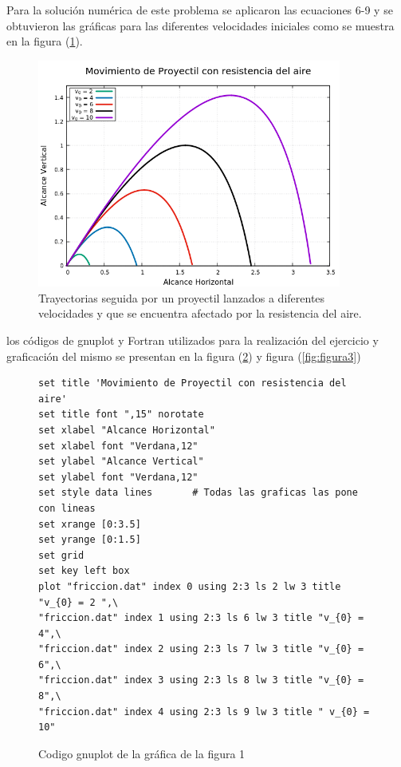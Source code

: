 \documentclass[12pt,a4paper,twoside]{article}
\begin{document}
Para la solución numérica de este  problema se aplicaron las ecuaciones 6-9  y se obtuvieron las gráficas para las diferentes velocidades iniciales como se muestra en la figura (\ref{fig:figura1}).

\newpage
\begin{figure}[h]
\centering
\includegraphics[width=10cm]{Imagen.png} 
\caption{Trayectorias seguida por un proyectil lanzados a diferentes velocidades y que se encuentra afectado por la resistencia del aire.}
\label{fig:figura1}
\end{figure}

los códigos de gnuplot y Fortran utilizados para la realización del ejercicio y graficación del mismo se presentan en la figura (\ref{fig:figura2}) y figura (\ref{fig:figura3})\\

\begin{figure}[h]
 \centering 
\begin{verbatim}
set title 'Movimiento de Proyectil con resistencia del aire'
set title font ",15" norotate
set xlabel "Alcance Horizontal"
set xlabel font "Verdana,12"
set ylabel "Alcance Vertical"
set ylabel font "Verdana,12"
set style data lines       # Todas las graficas las pone con lineas
set xrange [0:3.5]
set yrange [0:1.5]
set grid
set key left box
plot "friccion.dat" index 0 using 2:3 ls 2 lw 3 title "v_{0} = 2 ",\
"friccion.dat" index 1 using 2:3 ls 6 lw 3 title "v_{0} = 4",\
"friccion.dat" index 2 using 2:3 ls 7 lw 3 title "v_{0} = 6",\
"friccion.dat" index 3 using 2:3 ls 8 lw 3 title "v_{0} = 8",\
"friccion.dat" index 4 using 2:3 ls 9 lw 3 title " v_{0} = 10"
\end{verbatim}
\caption{Codigo gnuplot de la gráfica de la figura 1}
\label{fig:figura2}
\end{figure}
\end{document}
